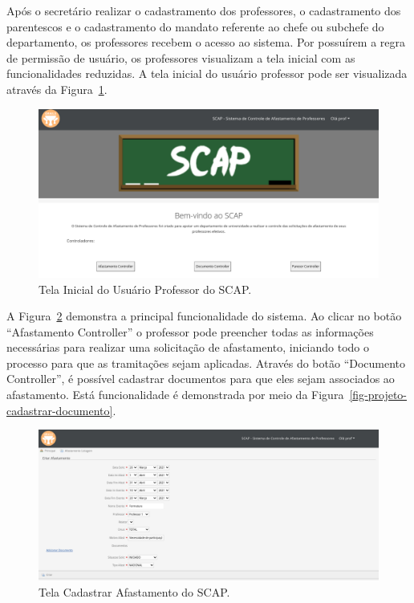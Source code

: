 Após o secretário realizar o cadastramento dos professores, o cadastramento dos parentescos e o cadastramento do mandato referente ao chefe ou subchefe do departamento, os professores recebem o acesso ao sistema. Por possuírem a regra de permissão de usuário, os professores visualizam a tela inicial com as funcionalidades reduzidas. A tela inicial do usuário professor pode ser visualizada através da Figura~\ref{fig-projeto-usuario-professor}. 

\begin{figure}[!h]
	\centering
	\includegraphics[scale=0.33]{figuras/fig-projeto-usuario-professor} 
	\caption{Tela Inicial do Usuário Professor do SCAP.}
	\label{fig-projeto-usuario-professor}
\end{figure}

A Figura~\ref{fig-projeto-cadastrar-afastamento} demonstra a principal funcionalidade do sistema. Ao clicar no botão ``Afastamento Controller'' o professor pode preencher todas as informações necessárias para realizar uma solicitação de afastamento, iniciando todo o processo para que as tramitações sejam aplicadas. Através do botão ``Documento Controller'', é possível cadastrar documentos para que eles sejam associados ao afastamento. Está funcionalidade é demonstrada por meio da Figura~\ref{fig-projeto-cadastrar-documento}.   

\begin{figure}[!h]
	\centering
	\includegraphics[scale=0.33]{figuras/fig-projeto-cadastrar-afastamento} 
	\caption{Tela Cadastrar Afastamento do SCAP.}
	\label{fig-projeto-cadastrar-afastamento}
\end{figure}

